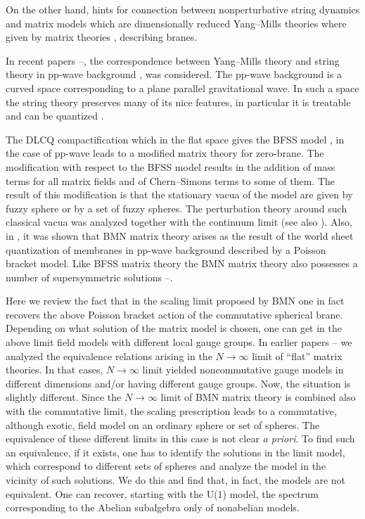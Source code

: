 \documentclass[a4paper]{article}
\begin{document}
On the other hand, hints for connection between nonperturbative
string dynamics and matrix models which are dimensionally reduced
Yang--Mills theories where given by matrix theories
\cite{Banks:1997vh,Ishibashi:1997xs}, describing branes.

In recent papers
\cite{Berenstein:2002jq}\nocite{Berenstein:2002zw}--\cite{Berenstein:2002sa},
the correspondence between Yang--Mills theory and string theory in
pp-wave background \cite{Blau:2002dy,Blau:2002mw}, was considered.
The pp-wave background is a curved space corresponding to a plane
parallel gravitational wave. In such a space the string theory
preserves many of its nice features, in particular it is treatable
and can be quantized \cite{Metsaev:2001bj}.

The DLCQ compactification which in the flat space gives the BFSS
model \cite{Banks:1997vh}, in the case of pp-wave leads to a
modified matrix theory for zero-brane. The modification with
respect to the BFSS model results in the addition of mass terms
for all matrix fields and of Chern--Simons terms to some of them.
The result of this modification is that the stationary vacua of
the model are given by fuzzy sphere or by a set of fuzzy spheres.
The perturbation theory around such classical vacua was analyzed
\cite{Dasgupta:2002hx} together with the continuum limit (see also
\cite{Valtancoli:2002rx}). Also, in \cite{Dasgupta:2002hx}, it was
shown that BMN matrix theory arises as the result of the world
sheet quantization of membranes in pp-wave background described by
a Poisson bracket model. Like BFSS matrix theory the BMN matrix
theory also possesses a number of supersymmetric solutions
\cite{Bak:2002rq}--\nocite{Bak:2002aq,Sugiyama:2002jq}\cite{Sugiyama:2002rs}.

Here we review the fact that in the scaling limit proposed by BMN
one in fact recovers the above Poisson bracket action of the
commutative spherical brane. Depending on what solution of the
matrix model is chosen, one can get in the above limit field
models with different local gauge groups. In earlier papers
\cite{Sochichiu:2000ud}\nocite{Sochichiu:2000bg,Sochichiu:2000kz,%
Kiritsis:2002py}--\cite{Sochichiu:2002jh} we analyzed the
equivalence relations arising in the $N\to\infty$ limit of
``flat'' matrix theories. In that cases, $N\to\infty$ limit
yielded noncommutative gauge models in different dimensions and/or
having different gauge groups. Now, the situation is slightly
different. Since the $N\to\infty$ limit of BMN matrix theory is
combined also with the commutative limit, the scaling prescription
leads to a commutative, although exotic, field model on an
ordinary sphere or set of spheres. The equivalence of these
different limits in this case is not clear \emph{a priori}. To
find such an equivalence, if it exists, one has to identify the
solutions in the limit model, which correspond to different sets
of spheres and analyze the model in the vicinity of such
solutions. We do this and find that, in fact, the models are not
equivalent. One can recover, starting with the U(1) model, the
spectrum corresponding to the Abelian subalgebra only of
nonabelian models.
\end{document}
